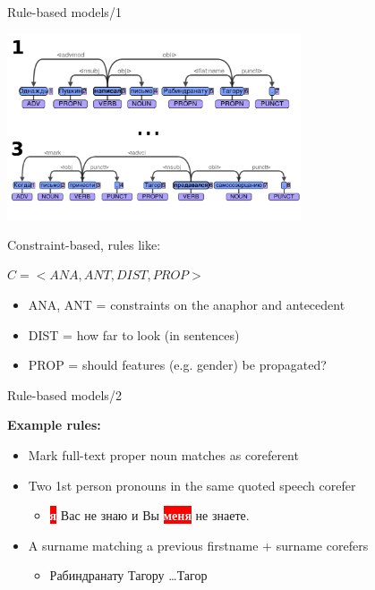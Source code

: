 \documentclass[dvipsnames, 10pt, compress]{beamer}
\newcommand{\redfillbox}[1]{\colorbox{red}{\textcolor{white}{{\bf #1}}}}
\begin{document}
\begin{frame}{Rule-based models/1} %

\begin{center}
\includegraphics[width=0.65\textwidth]{graphics/coref-dep-0.png}
\end{center}

Constraint-based, rules like:

$C = <ANA,  ANT, DIST, PROP>$

\begin{itemize}
  \item ANA, ANT = constraints on the anaphor and antecedent
  \item DIST = how far to look (in sentences)
  \item PROP = should features (e.g. gender) be propagated?
\end{itemize}

\end{frame}

\begin{frame}{Rule-based models/2} %

\textbf{Example rules:}

\begin{itemize}
  \item Mark full-text proper noun matches as coreferent
  \item Two 1st person pronouns in the same quoted speech corefer
  \begin{itemize}
    \item \redfillbox{я} Вас не знаю и Вы \redfillbox{меня} не знаете.
  \end{itemize}  
  \item A surname matching a previous firstname + surname corefers
  \begin{itemize}
     \item Рабиндранату Тагору \ldots Тагор
  \end{itemize}
\end{itemize}

\end{frame}
\end{document}
